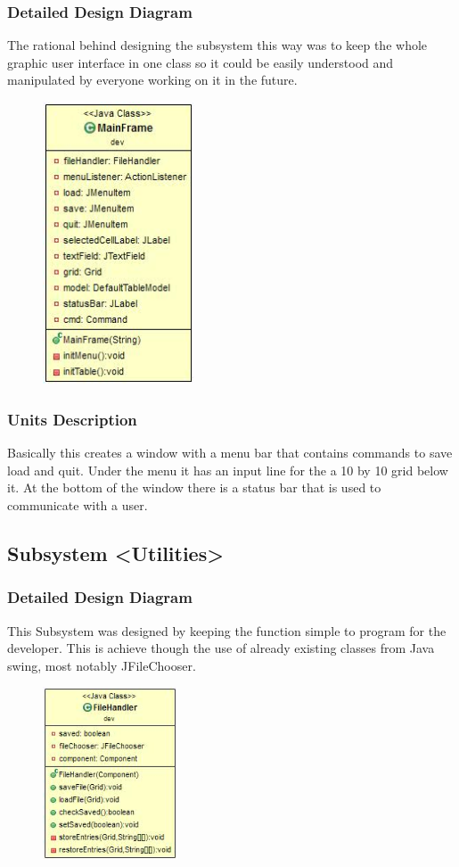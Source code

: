 \documentclass[12pt]{article}
\begin{document}
\subsubsection{Detailed Design Diagram}
The rational behind designing the subsystem this way was to keep the whole graphic user interface in one class so it could be easily understood and manipulated by everyone working on it in the future.
\begin{figure}[ht!]
\centering
\includegraphics[width=45mm]{SS2_GUI.jpg}
\end{figure}

\subsubsection{Units Description}
Basically this creates a window with a menu bar that contains commands to save load and quit. Under the menu it has an input line for the a 10 by 10 grid below it. At the bottom of the window there is a status bar that is used to communicate with a user. 

\subsection{Subsystem \textless Utilities\textgreater}
\subsubsection{Detailed Design Diagram}
This Subsystem was designed by keeping the function simple to program for the developer. This is achieve though the use of already existing classes from Java swing, most notably JFileChooser.
\begin{figure}[ht!]
\centering
\includegraphics[width=40mm]{SS3_SaveLoad.jpg}
\end{figure}
\end{document}
